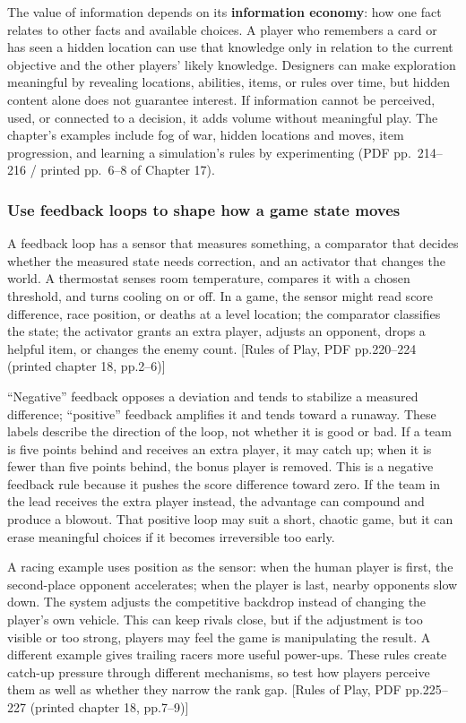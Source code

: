 The value of information depends on its \textbf{information economy}: how one fact relates to other facts and available choices. A player who remembers a card or has seen a hidden location can use that knowledge only in relation to the current objective and the other players' likely knowledge. Designers can make exploration meaningful by revealing locations, abilities, items, or rules over time, but hidden content alone does not guarantee interest. If information cannot be perceived, used, or connected to a decision, it adds volume without meaningful play. The chapter's examples include fog of war, hidden locations and moves, item progression, and learning a simulation's rules by experimenting (PDF pp.~214--216 / printed pp.~6--8 of Chapter 17).

\subsubsection{Use feedback loops to shape how a game state moves}\label{05-engine-i-ch009-use-feedback-loops-to-shape-how-a-game-state-moves}

A feedback loop has a sensor that measures something, a comparator that decides whether the measured state needs correction, and an activator that changes the world. A thermostat senses room temperature, compares it with a chosen threshold, and turns cooling on or off. In a game, the sensor might read score difference, race position, or deaths at a level location; the comparator classifies the state; the activator grants an extra player, adjusts an opponent, drops a helpful item, or changes the enemy count. {[}Rules of Play, PDF pp.220--224 (printed chapter 18, pp.2--6){]}

``Negative'' feedback opposes a deviation and tends to stabilize a measured difference; ``positive'' feedback amplifies it and tends toward a runaway. These labels describe the direction of the loop, not whether it is good or bad. If a team is five points behind and receives an extra player, it may catch up; when it is fewer than five points behind, the bonus player is removed. This is a negative feedback rule because it pushes the score difference toward zero. If the team in the lead receives the extra player instead, the advantage can compound and produce a blowout. That positive loop may suit a short, chaotic game, but it can erase meaningful choices if it becomes irreversible too early.

A racing example uses position as the sensor: when the human player is first, the second-place opponent accelerates; when the player is last, nearby opponents slow down. The system adjusts the competitive backdrop instead of changing the player's own vehicle. This can keep rivals close, but if the adjustment is too visible or too strong, players may feel the game is manipulating the result. A different example gives trailing racers more useful power-ups. These rules create catch-up pressure through different mechanisms, so test how players perceive them as well as whether they narrow the rank gap. {[}Rules of Play, PDF pp.225--227 (printed chapter 18, pp.7--9){]}


